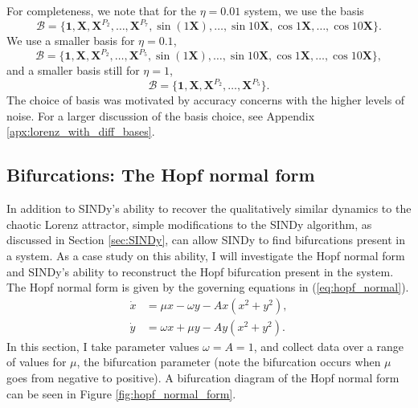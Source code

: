 \documentclass[10pt]{paper}
\begin{document}
For completeness, we note that for the $\eta = 0.01$ system, we use the basis $$\mathcal B = \{ \mathbf 1, \mathbf X, \mathbf X^{P_2}, \ldots, \mathbf X^{P_7}, \sin(1\mathbf X), \ldots, \sin{10\mathbf X}, \cos{1\mathbf X}, \ldots, \cos{10\mathbf X} \}.$$ We use a smaller basis for $\eta = 0.1$, $$\mathcal B = \{  \mathbf 1, \mathbf X, \mathbf X^{P_2}, \ldots, \mathbf X^{P_5}, \sin(1\mathbf X), \ldots, \sin{10\mathbf X}, \cos{1\mathbf X}, \ldots, \cos{10\mathbf X}\},$$ 
and a smaller basis still for $\eta = 1$, 
\[ \mathcal B = \{ \mathbf 1, \mathbf X, \mathbf X^{P_2}, \ldots, \mathbf X^{P_5} \}. \]
The choice of basis was motivated by accuracy concerns with the higher levels of noise. For a larger discussion of the basis choice, see Appendix \ref{apx:lorenz_with_diff_bases}.

\subsection{Bifurcations: The Hopf normal form} \label{sec:hopf_results}
In addition to SINDy's ability to recover the qualitatively similar dynamics to the chaotic Lorenz attractor, simple modifications to the SINDy algorithm, as discussed in Section \ref{sec:SINDy}, can allow SINDy to find bifurcations present in a system. 
As a case study on this ability, I will investigate the Hopf normal form and SINDy's ability to reconstruct the Hopf bifurcation present in the system. The Hopf normal form is given by the governing equations in (\ref{eq:hopf_normal}).
\begin{equation} \label{eq:hopf_normal}
	\begin{split}
		\dot x &= \mu x - \omega y - Ax(x^2 + y^2), \\
		\dot y &= \omega x +\mu y - Ay(x^2 + y^2).
	\end{split}
\end{equation} 
In this section, I take parameter values $\omega = A = 1$, and collect data over a range of values for $\mu$, the bifurcation parameter (note the bifurcation occurs when $\mu$ goes from negative to positive). 
A bifurcation diagram of the Hopf normal form can be seen in Figure \ref{fig:hopf_normal_form}. 
\end{document}
